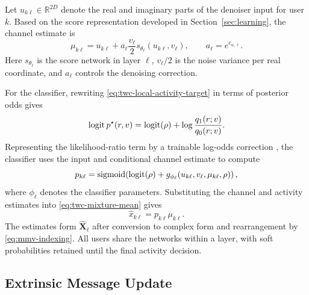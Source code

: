 Let $u_{k\ell}\in\mathbb R^{2D}$ denote the real and imaginary parts
of the denoiser input for user $k$. Based on the score representation developed
in Section~\ref{sec:learning}, the channel estimate is
\begin{equation}
 \mu_{k\ell}=u_{k\ell}
       +a_\ell\frac{v_\ell}{2}s_{\theta_\ell}(u_{k\ell},v_\ell),
 \qquad a_\ell=e^{c_{\alpha,\ell}}.
 \label{eq:twc-conditional-mean}
\end{equation}
Here $s_{\theta_\ell}$ is the score network in layer $\ell$,
$v_\ell/2$ is the noise variance per real coordinate, and $a_\ell$
controls the denoising correction.

For the classifier, rewriting \eqref{eq:twc-local-activity-target}
in terms of posterior odds gives
\begin{equation}
 \operatorname{logit} p^\star(r,v)
 =\operatorname{logit}(\rho)+\log\frac{q_1(r;v)}{q_0(r;v)}.
 \label{eq:twc-activity-odds}
\end{equation}
Representing the likelihood-ratio term by a trainable log-odds
correction \cite{menon2016}, the classifier uses the input and
conditional channel estimate to compute
\begin{equation}
 p_{k\ell}=\operatorname{sigmoid}\!\left(\operatorname{logit}(\rho)+
 g_{\phi_\ell}(u_{k\ell},v_\ell,\mu_{k\ell},\rho)\right),
 \label{eq:twc-activity}
\end{equation}
where $\phi_\ell$ denotes the classifier parameters.
Substituting the channel and activity estimates into
\eqref{eq:twc-mixture-mean} gives
\begin{equation}
 \widehat x_{k\ell}=p_{k\ell}\mu_{k\ell}.
 \label{eq:twc-estimate}
\end{equation}
The estimates form $\widehat{\mathbf X}_\ell$ after conversion to
complex form and rearrangement by \eqref{eq:mmv-indexing}.
All users share the networks within a layer, with soft probabilities
retained until the final activity decision.

\subsection{Extrinsic Message Update}

